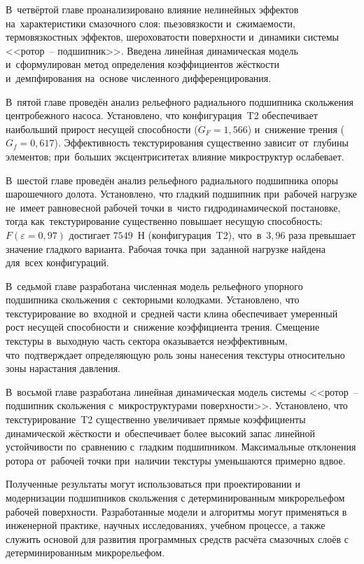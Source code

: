 В~четвёртой главе проанализировано влияние нелинейных эффектов на~характеристики смазочного слоя: пьезовязкости и~сжимаемости, термовязкостных эффектов, шероховатости поверхности и~динамики системы <<ротор~-- подшипник>>. Введена линейная динамическая модель и~сформулирован метод определения коэффициентов жёсткости и~демпфирования на~основе численного дифференцирования.

В~пятой главе проведён анализ рельефного радиального подшипника скольжения центробежного насоса. Установлено, что конфигурация~T2 обеспечивает наибольший прирост несущей способности ($G_F = 1{,}566$) и~снижение трения ($G_f = 0{,}617$). Эффективность текстурирования существенно зависит от~глубины элементов; при~больших эксцентриситетах влияние микроструктур ослабевает.

В~шестой главе проведён анализ рельефного радиального подшипника опоры шарошечного долота. Установлено, что гладкий подшипник при~рабочей нагрузке не~имеет равновесной рабочей точки в~чисто гидродинамической постановке, тогда как~текстурирование существенно повышает несущую способность: $F(\varepsilon = 0{,}97)$ достигает $7549$~Н (конфигурация~T2), что~в~$3{,}96$ раза превышает значение гладкого варианта. Рабочая точка при~заданной нагрузке найдена для~всех конфигураций.

В~седьмой главе разработана численная модель рельефного упорного подшипника скольжения с~секторными колодками. Установлено, что текстурирование во~входной и~средней части клина обеспечивает умеренный рост несущей способности и~снижение коэффициента трения. Смещение текстуры в~выходную часть сектора оказывается неэффективным, что~подтверждает определяющую роль зоны нанесения текстуры относительно зоны нарастания давления.

В~восьмой главе разработана линейная динамическая модель системы <<ротор~-- подшипник скольжения с~микроструктурами поверхности>>. Установлено, что текстурирование~T2 существенно увеличивает прямые коэффициенты динамической жёсткости и~обеспечивает более высокий запас линейной устойчивости по~сравнению с~гладким подшипником. Максимальные отклонения ротора от~рабочей точки при~наличии текстуры уменьшаются примерно вдвое.

Полученные результаты могут использоваться при проектировании
и модернизации подшипников скольжения с детерминированным
микрорельефом рабочей поверхности. Разработанные
модели и алгоритмы могут применяться в инженерной практике,
научных исследованиях, учебном процессе, а также служить
основой для развития программных средств расчёта смазочных
слоёв с детерминированным микрорельефом.
